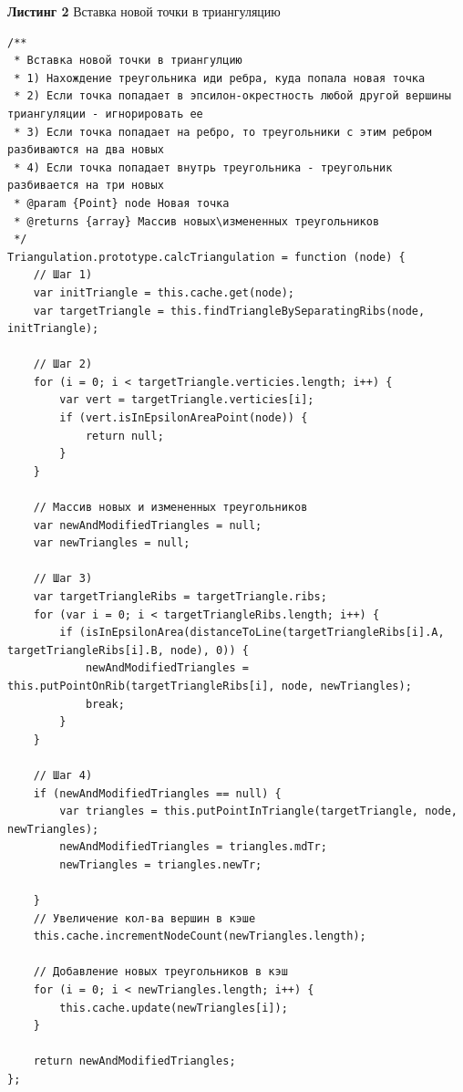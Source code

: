 \documentclass[a4paper, 12pt]{article}   	%
\begin{document}
\textbf{Листинг 2} Вставка новой точки в триангуляцию
\begin{verbatim}
/**
 * Вставка новой точки в триангулцию
 * 1) Нахождение треугольника иди ребра, куда попала новая точка
 * 2) Если точка попадает в эпсилон-окрестность любой другой вершины триангуляции - игнорировать ее
 * 3) Если точка попадает на ребро, то треугольники с этим ребром разбиваются на два новых
 * 4) Если точка попадает внутрь треугольника - треугольник разбивается на три новых
 * @param {Point} node Новая точка
 * @returns {array} Массив новых\измененных треугольников
 */
Triangulation.prototype.calcTriangulation = function (node) {
    // Шаг 1)
    var initTriangle = this.cache.get(node);
    var targetTriangle = this.findTriangleBySeparatingRibs(node, initTriangle);

    // Шаг 2)
    for (i = 0; i < targetTriangle.verticies.length; i++) {
        var vert = targetTriangle.verticies[i];
        if (vert.isInEpsilonAreaPoint(node)) {
            return null;
        }
    }

    // Массив новых и измененных треугольников
    var newAndModifiedTriangles = null;
    var newTriangles = null;

    // Шаг 3)
    var targetTriangleRibs = targetTriangle.ribs;
    for (var i = 0; i < targetTriangleRibs.length; i++) {
        if (isInEpsilonArea(distanceToLine(targetTriangleRibs[i].A, targetTriangleRibs[i].B, node), 0)) {
            newAndModifiedTriangles = this.putPointOnRib(targetTriangleRibs[i], node, newTriangles);
            break;
        }
    }

    // Шаг 4)
    if (newAndModifiedTriangles == null) {
        var triangles = this.putPointInTriangle(targetTriangle, node, newTriangles);
        newAndModifiedTriangles = triangles.mdTr;
        newTriangles = triangles.newTr;

    }
    // Увеличение кол-ва вершин в кэше
    this.cache.incrementNodeCount(newTriangles.length);

    // Добавление новых треугольников в кэш
    for (i = 0; i < newTriangles.length; i++) {
        this.cache.update(newTriangles[i]);
    }

    return newAndModifiedTriangles;
};
\end{verbatim}
\end{document}
